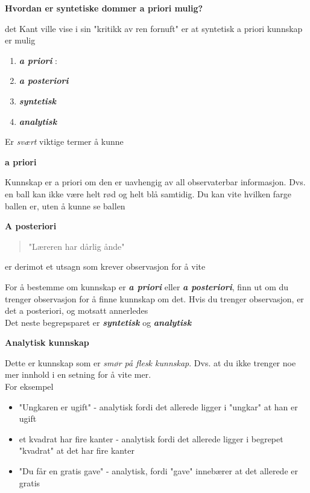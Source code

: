 \documentclass[11pt, a4paper]{article}
\newenvironment{sectionbox}[1][]{%
    \begin{sectionboxinner}
    \textbf{\large #1}
    \vspace{1pt}
    \newline
}{%
    \end{sectionboxinner}
}
\newenvironment{subsectionbox}[1][]{%
    \begin{subsectionboxinner}
    \textbf{#1}
    \vspace{3pt}
    \newline
}{%
    \end{subsectionboxinner}
}
\begin{document}
\begin{sectionbox}[Hvordan er syntetiske dommer a priori mulig?]

det Kant ville vise i sin "kritikk av ren fornuft" er at syntetisk a priori kunnskap er mulig

\begin{enumerate}
    \item \textbf{\textit{a priori}} :
    \item \textbf{\textit{a posteriori}}
    \item \textbf{\textit{syntetisk}}
    \item \textbf{\textit{analytisk}}
\end{enumerate}

Er \textit{svært} viktige termer å kunne

\begin{subsectionbox}[a priori]
Kunnskap er a priori om den er uavhengig av all observaterbar informasjon. Dvs. en ball kan ikke være helt rød og helt blå samtidig. Du kan vite hvilken farge ballen er, uten å kunne se ballen
\end{subsectionbox}


\begin{subsectionbox}[A posteriori]
\begin{quote}
    "Læreren har dårlig ånde" 
\end{quote}
er derimot et utsagn som krever observasjon for å vite 
\end{subsectionbox}

For å bestemme om kunnskap er \textbf{\textit{a priori}} eller \textbf{\textit{a posteriori}}, finn ut om du trenger observasjon for å finne kunnskap om det. Hvis du trenger observasjon, er det a posteriori, og motsatt annerledes\\

Det neste begrepsparet er \textbf{\textit{syntetisk}} og \textbf{\textit{analytisk}} 


\begin{subsectionbox}[Analytisk kunnskap]
Dette er kunnskap som er \textit{smør på flesk kunnskap}. Dvs. at du ikke trenger noe mer innhold i en setning for å vite mer.\\

For eksempel
\begin{itemize}
    \item "Ungkaren er ugift" - analytisk fordi det allerede ligger i "ungkar" at han er ugift
    \item et kvadrat har fire kanter - analytisk fordi det allerede ligger i begrepet "kvadrat" at det har fire kanter
    \item "Du får en gratis gave" - analytisk, fordi "gave" innebærer at det allerede er gratis
\end{itemize}


\end{subsectionbox}
\end{sectionbox}
\end{document}

